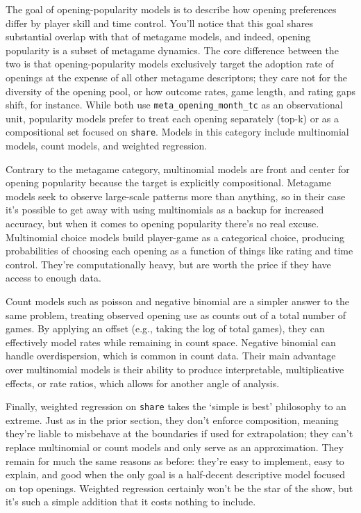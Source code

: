 \documentclass[
  12pt]{article}
\begin{document}
The goal of opening-popularity models is to describe how opening
preferences differ by player skill and time control. You'll notice that
this goal shares substantial overlap with that of metagame models, and
indeed, opening popularity is a subset of metagame dynamics. The core
difference between the two is that opening-popularity models exclusively
target the adoption rate of openings at the expense of all other
metagame descriptors; they care not for the diversity of the opening
pool, or how outcome rates, game length, and rating gaps shift, for
instance. While both use \texttt{meta\_opening\_month\_tc} as an
observational unit, popularity models prefer to treat each opening
separately (top-k) or as a compositional set focused on \texttt{share}.
Models in this category include multinomial models, count models, and
weighted regression.

Contrary to the metagame category, multinomial models are front and
center for opening popularity because the target is explicitly
compositional. Metagame models seek to observe large-scale patterns more
than anything, so in their case it's possible to get away with using
multinomials as a backup for increased accuracy, but when it comes to
opening popularity there's no real excuse. Multinomial choice models
build player-game as a categorical choice, producing probabilities of
choosing each opening as a function of things like rating and time
control. They're computationally heavy, but are worth the price if they
have access to enough data.

Count models such as poisson and negative binomial are a simpler answer
to the same problem, treating observed opening use as counts out of a
total number of games. By applying an offset (e.g., taking the log of
total games), they can effectively model rates while remaining in count
space. Negative binomial can handle overdispersion, which is common in
count data. Their main advantage over multinomial models is their
ability to produce interpretable, multiplicative effects, or rate
ratios, which allows for another angle of analysis.

Finally, weighted regression on \texttt{share} takes the `simple is
best' philosophy to an extreme. Just as in the prior section, they don't
enforce composition, meaning they're liable to misbehave at the
boundaries if used for extrapolation; they can't replace multinomial or
count models and only serve as an approximation. They remain for much
the same reasons as before: they're easy to implement, easy to explain,
and good when the only goal is a half-decent descriptive model focused
on top openings. Weighted regression certainly won't be the star of the
show, but it's such a simple addition that it costs nothing to include.
\end{document}
